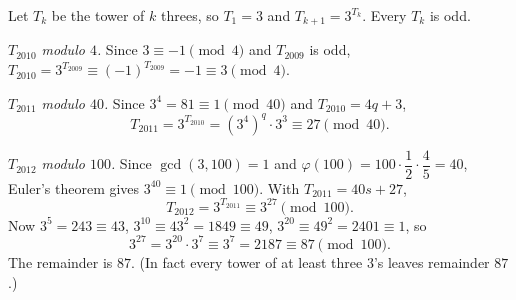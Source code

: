 Let $T_k$ be the tower of $k$ threes, so $T_1=3$ and $T_{k+1}=3^{T_k}$. Every $T_k$ is odd.

\emph{$T_{2010}$ modulo $4$.} Since $3\equiv-1\pmod4$ and $T_{2009}$ is odd, $T_{2010}=3^{T_{2009}}\equiv(-1)^{T_{2009}}=-1\equiv3\pmod4$.

\emph{$T_{2011}$ modulo $40$.} Since $3^4=81\equiv1\pmod{40}$ and $T_{2010}=4q+3$,
\[T_{2011}=3^{T_{2010}}=\left(3^4\right)^q\cdot3^3\equiv27\pmod{40}.\]

\emph{$T_{2012}$ modulo $100$.} Since $\gcd(3,100)=1$ and $\varphi(100)=100\cdot\dfrac12\cdot\dfrac45=40$, Euler's theorem gives $3^{40}\equiv1\pmod{100}$. With $T_{2011}=40s+27$,
\[T_{2012}=3^{T_{2011}}\equiv3^{27}\pmod{100}.\]
Now $3^5=243\equiv43$, $3^{10}\equiv43^2=1849\equiv49$, $3^{20}\equiv49^2=2401\equiv1$, so
\[3^{27}=3^{20}\cdot3^{7}\equiv3^7=2187\equiv87\pmod{100}.\]
The remainder is $\boxed{87}$. (In fact every tower of at least three $3$'s leaves remainder $87$.)
